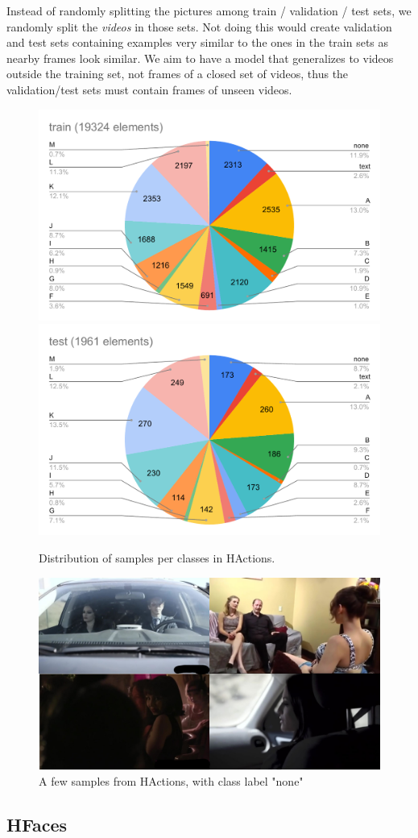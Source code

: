 Instead of randomly splitting the pictures among train / validation / test sets, we randomly split the \emph{videos} in those sets. Not doing this would create validation and test sets containing examples very similar to the ones in the train sets as nearby frames look similar. We aim to have a model that generalizes to videos outside the training set, not frames of a closed set of videos, thus the validation/test sets must contain frames of unseen videos.

\begin{figure}
    \centering
    \includegraphics[width=0.45\columnwidth]{20-files/train.pdf}
    \includegraphics[width=0.45\columnwidth]{20-files/test.pdf}
    \caption{Distribution of samples per classes in HActions.}
    \label{fig:xactions}
\end{figure}

\begin{figure}
    \centering
    \includegraphics[width=0.7\columnwidth]{20-files/actions.jpg}
    \caption{A few samples from HActions, with class label "none"}
    \label{fig:xactionsamples}
\end{figure}


\subsection{HFaces}


